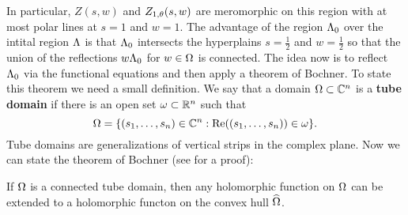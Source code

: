 \documentclass[12pt,reqno,oneside]{amsart}
\begin{document}
    \begin{center}
    \end{center}
    
    In particular, $Z(s,w)$ and $Z_{1,\theta}(s,w)$ are meromorphic on this region with at most polar lines at $s = 1$ and $w = 1$. The advantage of the region $\Lambda_{0}$ over the intital region $\Lambda$ is that $\Lambda_{0}$ intersects the hyperplains $s = \frac{1}{2}$ and $w = \frac{1}{2}$ so that the union of the reflections $w\Lambda_{0}$ for $w \in \Omega$ is connected. The idea now is to reflect $\Lambda_{0}$ via the functional equations and then apply a theorem of Bochner. To state this theorem we need a small definition. We say that a domain $\Omega \subset \mathbb{C}^{n}$ is a \textbf{tube domain} if there is an open set $\omega \subset \mathbb{R}^{n}$ such that
    \[
        \Omega = \{(s_{1},\ldots,s_{n}) \in \mathbb{C}^{n}:\mathrm{Re}((s_{1},\ldots,s_{n})) \in \omega\}.
    \]
    Tube domains are generalizations of vertical strips in the complex plane. Now we can state the theorem of Bochner (see \cite{hormander2000introduction} for a proof):

    \begin{theorem}
        If $\Omega$ is a connected tube domain, then any holomorphic function on $\Omega$ can be extended to a holomorphic functon on the convex hull $\widehat{\Omega}$.
    \end{theorem}
\end{document}
